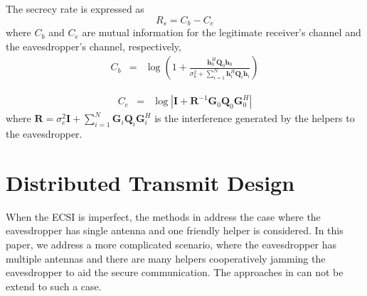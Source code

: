 \documentclass[journal]{IEEEtran}
\begin{document}
%
The secrecy rate is expressed as
\begin{equation}
R_s = C_b - C_e
\end{equation}
where $C_b$ and $C_e$ are mutual information for the legitimate receiver's channel and the eavesdropper's channel, respectively,
\begin{eqnarray}
C_b&=&
\log\left(1 + \frac{ \mathbf{h}_{0}^H\mathbf{Q}_{0}\mathbf{h}_{0}}{\sigma_b^2 + \sum_{i=1}^{N}\mathbf{h}_{i}^H\mathbf{Q}_{i}\mathbf{h}_i}\right)
\end{eqnarray}

\begin{eqnarray}
C_e&=& \log\left|\mathbf{I}+\mathbf{R}^{-1}\mathbf{G}_0\mathbf{Q}_0\mathbf{G}_0^H\right|
\end{eqnarray}
where $\mathbf{R} = \sigma_e^2\mathbf{I}+\sum_{i=1}^{N}\mathbf{G}_i\mathbf{Q}_i\mathbf{G}_i^H$ is the interference generated by the helpers to the eavesdropper.


%
%

\section{Distributed Transmit Design}
When the ECSI is imperfect, the methods in \cite{Zhang_Cooperative2015,huang_robust_2012} address the case where the eavesdropper has single antenna and one friendly helper is considered. In this paper, we address a more complicated scenario, where the eavesdropper has multiple antennas and there are many helpers cooperatively jamming the eavesdropper to aid the secure communication. The approaches in \cite{Zhang_Cooperative2015,huang_robust_2012} can not be extend to such a case. 
\end{document}
